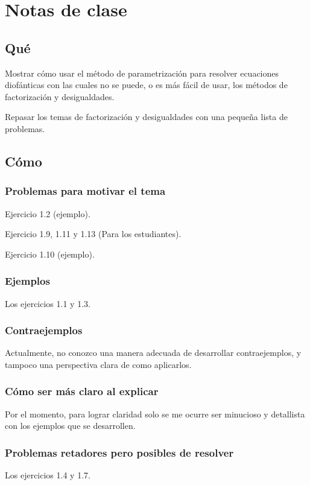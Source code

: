 \newpage
\section{Notas de clase}

\subsection{Qué}

Mostrar cómo usar el método de parametrización para resolver ecuaciones diofánticas con las cuales no se puede, o es más
fácil de usar, los métodos de factorización y desigualdades.

Repasar los temas de factorización y desigualdades con una pequeña lista de problemas.

\subsection{Cómo}

\subsubsection{Problemas para motivar el tema}
Ejercicio 1.2 (ejemplo).

Ejercicio 1.9, 1.11 y 1.13 (Para los estudiantes).

Ejercicio 1.10 (ejemplo).

\subsubsection{Ejemplos}
Los ejercicios 1.1 y 1.3.

\subsubsection{Contraejemplos}
Actualmente, no conozco una manera adecuada de desarrollar contraejemplos, y tampoco una perspectiva clara de como aplicarlos.

\subsubsection{Cómo ser más claro al explicar}
Por el momento, para lograr claridad solo se me ocurre ser minucioso y detallista con los ejemplos que se desarrollen.

\subsubsection{Problemas retadores pero posibles de resolver}
Los ejercicios 1.4 y 1.7.

